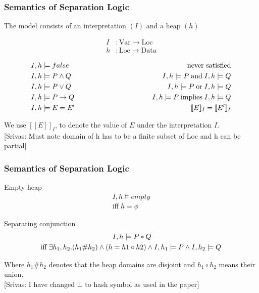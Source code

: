 \documentclass{beamer}
\newcommand{\mscmt}[1]{{\color{blue} [Srivas: {#1}]}}
\begin{document}
\begin{frame}
\frametitle{Semantics of Separation Logic}
The model consists of an interpretation $(I)$ and a heap $(h)$

\begin{align*}
    I &: \textrm{Var} \to \textrm{Loc} \\ 
    h &: \textrm{Loc} \to \textrm{Data}
\end{align*}

\begin{align*}
    I,h &\models false \hspace{3.5cm}     & \textrm {never satisfied} \\
    I,h &\models P \land Q \hspace{3.5cm} & I,h \models P \; \textrm{and} \; I,h \models Q \\
    I,h &\models P \lor Q \hspace{3.5cm} & I,h \models P \; \textrm{or} \; I,h \models Q \\
    I,h &\models P \to Q \hspace{3.5cm} & I,h \models P \; \textrm{implies} \; I,h \models Q \\
    I,h &\models E = E' \hspace{3.5cm} & [\![ E ]\!]_I = [\![ E' ]\!]_I
\end{align*}

We use $[\![E]\!]_I$, to denote the value of $E$ under the interpretation $I$.\\
\mscmt{\tiny{Must note domain of h has to be a finite subset of Loc and h  can be partial}}
\end{frame}

\begin{frame}
\frametitle{Semantics of Separation Logic}

Empty heap
\begin{align*}
    I,h \models empty \\ 
    \textrm{iff} \; h = \phi
\end{align*}

Separating conjunction
\begin{align*}
    I,h \models P * Q \hspace{3.5cm} \\ 
    \textrm{iff} \; \exists h_1,h_2.(h_1 \# h_2) \land (h = h1 \circ h2) \land I,h_1 \models P \land I,h_2 \models Q \\
\end{align*}

Where $h_1 \# h_2$ denotes that the heap domains are disjoint and $h_1 \circ h_2$ means their union. \\
\mscmt{\tiny{I have changed $\bot$ to hash symbol as used in the paper}}
\end{frame}
\end{document}
